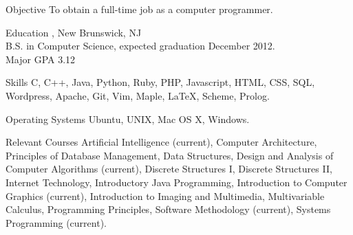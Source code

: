 \documentclass{resume}
\author{~~~~~~Michael J. Wilcox}
\begin{document}
\maketitle

\begin{category}{Objective}
\citemnobullet
To obtain a full-time job as a computer programmer.
\end{category}


\begin{category}{Education}
, New Brunswick, NJ\\
B.S. in Computer Science, expected graduation December 2012.\\
Major GPA 3.12
\end{category}

\begin{category}{Skills}
\citemnobullet 
C, C++, Java, Python, Ruby, PHP, Javascript, HTML, CSS, SQL, Wordpress, Apache, Git, Vim, Maple, \LaTeX, Scheme, Prolog.
\end{category}

\begin{category}{Operating Systems}
\citemnobullet
Ubuntu, UNIX, Mac OS X, Windows.\\
\end{category}

\begin{category}{Relevant Courses}
\citemnobullet
Artificial Intelligence (current), Computer Architecture, Principles of Database Management, Data Structures, Design and Analysis of Computer Algorithms (current), Discrete Structures I, Discrete Structures II, Internet Technology, Introductory Java Programming, Introduction to Computer Graphics (current), Introduction to Imaging and Multimedia, Multivariable Calculus, Programming Principles, Software Methodology (current), Systems Programming (current).\\
\end{category}
\end{document}
